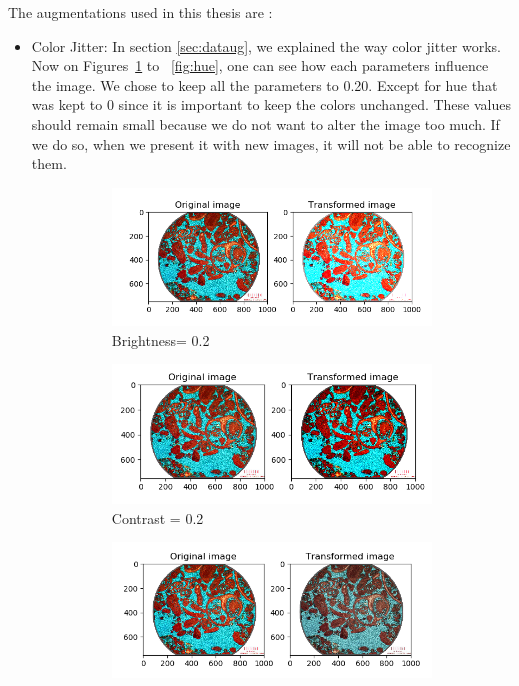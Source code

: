 The augmentations used in this thesis are :
\begin{itemize}
    \item Color Jitter: In section \ref{sec:dataug}, we explained the way color jitter works. Now on Figures~\ref{fig:brightness} to ~\ref{fig:hue}, one can see how each parameters influence the image.
    We chose to keep all the parameters to 0.20. Except for hue that was kept to 0 since it is important to keep the colors unchanged. These values should remain small because we do not want to alter the image too much. If we do so, when we present it with new images, it will not be able to recognize them. 

\begin{figure}
\begin{subfigure}{.5\textwidth}
  \centering
  \includegraphics[width=.8\linewidth]{figures/03-bightness08.PNG}
  \caption{Brightness= 0.2}
  \label{fig:brightness}
\end{subfigure}%
\begin{subfigure}{.5\textwidth}
  \centering
  \includegraphics[width=.8\linewidth]{figures/03-contrast1.PNG}
  \caption{Contrast = 0.2}
  \label{fig:contrast}
\end{subfigure}
\begin{subfigure}{.5\textwidth}
  \centering
  \includegraphics[width=.8\linewidth]{figures/03-saturation0.PNG}

\end{subfigure}
\end{figure}
\end{itemize}
